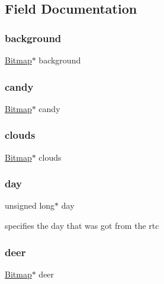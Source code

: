 \subsection{Field Documentation}
\mbox{\label{struct_game_a15de70574bc710486bf129a5c8f1634e}} 
\subsubsection{\texorpdfstring{background}{background}}
{\footnotesize\ttfamily \hyperlink{struct_bitmap}{Bitmap}$\ast$ background}

\mbox{\label{struct_game_a348b1dd54ea8a2a753876f57734af5fe}} 
\subsubsection{\texorpdfstring{candy}{candy}}
{\footnotesize\ttfamily \hyperlink{struct_bitmap}{Bitmap}$\ast$ candy}

\mbox{\label{struct_game_a4352a17620cefeeae07479826bd7dd27}} 
\subsubsection{\texorpdfstring{clouds}{clouds}}
{\footnotesize\ttfamily \hyperlink{struct_bitmap}{Bitmap}$\ast$ clouds}

\mbox{\label{struct_game_a47e819829ec45fd80f4994e3e07bd464}} 
\subsubsection{\texorpdfstring{day}{day}}
{\footnotesize\ttfamily unsigned long$\ast$ day}



specifies the day that was got from the rtc 

\mbox{\label{struct_game_a8b5c5b1b81938802ce28261a7bcd6121}} 
\subsubsection{\texorpdfstring{deer}{deer}}
{\footnotesize\ttfamily \hyperlink{struct_bitmap}{Bitmap}$\ast$ deer}

